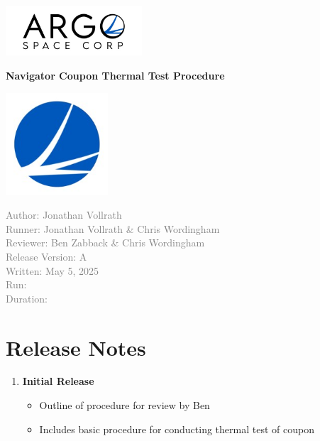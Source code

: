 \documentclass[11pt]{article}
\begin{document}
    \doublespacing
    \begin{titlepage}
        \centering

        \includegraphics[width=2in]{argo-space.jpg}

        \vspace*{1.5cm}
        \Huge
        \textbf{Navigator Coupon Thermal Test Procedure}

        \vfill

        \includegraphics[width = 1.5in]{argo_space_logo.jpg}

        \normalsize
        \textcolor{gray}{Author: Jonathan Vollrath} \\
        \textcolor{gray}{Runner: Jonathan Vollrath \& Chris Wordingham} \\
        \textcolor{gray}{Reviewer: Ben Zabback \& Chris Wordingham} \\
        \textcolor{gray}{Release Version: A} \\
        \textcolor{gray}{Written: May 5, 2025} \\
        \textcolor{gray}{Run: } \\
        \textcolor{gray}{Duration: }
    \end{titlepage}

    \section*{Release Notes}

        \begin{enumerate}[label=\Alph*.]
            \item \textbf{Initial Release}
            \begin{itemize}
                \item Outline of procedure for review by Ben
                \item Includes basic procedure for conducting thermal test of coupon
            \end{itemize}
        \end{enumerate}
\end{document}

